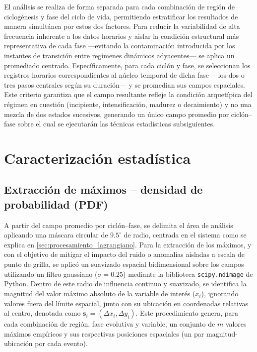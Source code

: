 El análisis se realiza de forma separada para cada combinación de región de ciclogénesis y fase del ciclo de vida, permitiendo estratificar los resultados de manera simultánea por estos dos factores. 
Para reducir la variabilidad de alta frecuencia inherente a los datos horarios y aislar la condición estructural más representativa de cada fase —evitando la contaminación introducida por los instantes de transición entre regímenes dinámicos adyacentes— se aplica un promediado centrado. 
Específicamente, para cada ciclón y fase, se seleccionan los registros horarios correspondientes al núcleo temporal de dicha fase —los dos o tres pasos centrales según su duración— y se promedian sus campos espaciales. 
Este criterio garantiza que el campo resultante refleje la condición arquetípica del régimen en cuestión (incipiente, intensificación, madurez o decaimiento) y no una mezcla de dos estados sucesivos, generando un único campo promedio por ciclón--fase sobre el cual se ejecutarán las técnicas estadísticas subsiguientes.

\section{Caracterización estadística}\label{sec:tecnicas_estadisticas}

\subsection{Extracción de máximos -- densidad de probabilidad (PDF)}\label{subsec:extraccion_pdf}

A partir del campo promedio por ciclón--fase, se delimita el área de análisis aplicando una máscara circular de $9.5^{\circ}$ de radio, centrada en el sistema como se explica en \ref{sec:procesamiento_lagrangiano}. 
Para la extracción de los máximos, y con el objetivo de mitigar el impacto del ruido o anomalías aisladas a escala de punto de grilla, se aplicó un suavizado espacial bidimensional sobre los campos utilizando un filtro gaussiano ($\sigma = 0.25$) mediante la biblioteca \texttt{scipy.ndimage} de Python. 
Dentro de este radio de influencia continuo y suavizado, se identifica la magnitud del valor máximo absoluto de la variable de interés ($x_i$), ignorando valores fuera del límite espacial, junto con su ubicación en coordenadas relativas al centro, denotada como $\mathbf{s}_i=(\Delta x_i,\Delta y_i)$. 
Este procedimiento genera, para cada combinación de región, fase evolutiva y variable, un conjunto de $m$ valores máximos empíricos y sus respectivas posiciones espaciales (un par magnitud-ubicación por cada evento).

